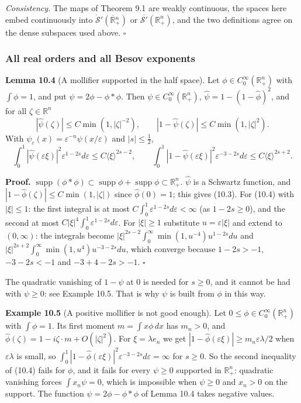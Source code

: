 \documentclass[
  11pt,
]{article}
\begin{document}
\emph{Consistency.} The maps of Theorem 9.1 are weakly continuous, the
spaces here embed continuously into
\(\dot{\mathcal S}'(\overline{\mathbb R}{}^n_+)\) or
\(\overline{\mathcal S'}(\mathbb R^n_+)\), and the two definitions agree
on the dense subspaces used above. \(\square\)

\subsubsection{All real orders and all Besov
exponents}\label{all-real-orders-and-all-besov-exponents}

\textbf{Lemma 10.4} (A mollifier supported in the half space). Let
\(\phi\in C_0^\infty(\mathbb R^n_+)\) with \(\int\phi=1\), and put
\(\psi=2\phi-\phi*\phi\). Then \(\psi\in C_0^\infty(\mathbb R^n_+)\),
\(\widehat\psi=1-(1-\widehat\phi)^2\), and for all
\(\zeta\in\mathbb R^n\) \[
|\widehat\psi(\zeta)|\leq C\min(1,|\zeta|^{-2}),\qquad|1-\widehat\psi(\zeta)|\leq C\min(1,|\zeta|^2).
\tag{10.3}
\] With \(\psi_\varepsilon(x)=\varepsilon^{-n}\psi(x/\varepsilon)\) and
\(|s|\leq\tfrac12\), \[
\int_0^1|\widehat\psi(\varepsilon\xi)|^2\varepsilon^{1-2s}d\varepsilon\leq C\langle\xi\rangle^{2s-2},\qquad
\int_0^1|1-\widehat\psi(\varepsilon\xi)|^2\varepsilon^{-3-2s}d\varepsilon\leq C\langle\xi\rangle^{2s+2}.
\tag{10.4}
\]

\textbf{Proof.}
\(\operatorname{supp}(\phi*\phi)\subset\operatorname{supp}\phi+\operatorname{supp}\phi\subset\mathbb R^n_+\).
\(\widehat\psi\) is a Schwartz function, and
\(|1-\widehat\phi(\zeta)|\leq C\min(1,|\zeta|)\) since
\(\widehat\phi(0)=1\); this gives (10.3). For (10.4) with
\(|\xi|\leq1\): the first integral is at most
\(C\int_0^1\varepsilon^{1-2s}d\varepsilon<\infty\) (as \(1-2s\geq0\)),
and the second at most
\(C|\xi|^4\int_0^1\varepsilon^{1-2s}d\varepsilon\). For \(|\xi|\geq1\)
substitute \(u=\varepsilon|\xi|\) and extend to \((0,\infty)\): the
integrals become \(|\xi|^{2s-2}\int_0^\infty\min(1,u^{-4})u^{1-2s}du\)
and \(|\xi|^{2s+2}\int_0^\infty\min(1,u^4)u^{-3-2s}du\), which converge
because \(1-2s>-1\), \(-3-2s<-1\) and \(-3+4-2s>-1\). \(\square\)

The quadratic vanishing of \(1-\widehat\psi\) at 0 is needed for
\(s\geq0\), and it cannot be had with \(\psi\geq0\): see Example 10.5.
That is why \(\psi\) is built from \(\phi\) in this way.

\textbf{Example 10.5} (A positive mollifier is not good enough). Let
\(0\leq\phi\in C_0^\infty(\mathbb R^n_+)\) with \(\int\phi=1\). Its
first moment \(m=\int x\phi\,dx\) has \(m_n>0\), and
\(\widehat\phi(\zeta)=1-i\zeta\cdot m+O(|\zeta|^2)\). For
\(\xi=\lambda e_n\) we get
\(|1-\widehat\phi(\varepsilon\xi)|\geq m_n\varepsilon\lambda/2\) when
\(\varepsilon\lambda\) is small, so
\(\int_0^1|1-\widehat\phi(\varepsilon\xi)|^2\varepsilon^{-3-2s}d\varepsilon=\infty\)
for \(s\geq0\). So the second inequality of (10.4) fails for \(\phi\),
and it fails for every \(\psi\geq0\) supported in \(\mathbb R^n_+\):
quadratic vanishing forces \(\int x_n\psi=0\), which is impossible when
\(\psi\geq0\) and \(x_n>0\) on the support. The function
\(\psi=2\phi-\phi*\phi\) of Lemma 10.4 takes negative values.
\end{document}
